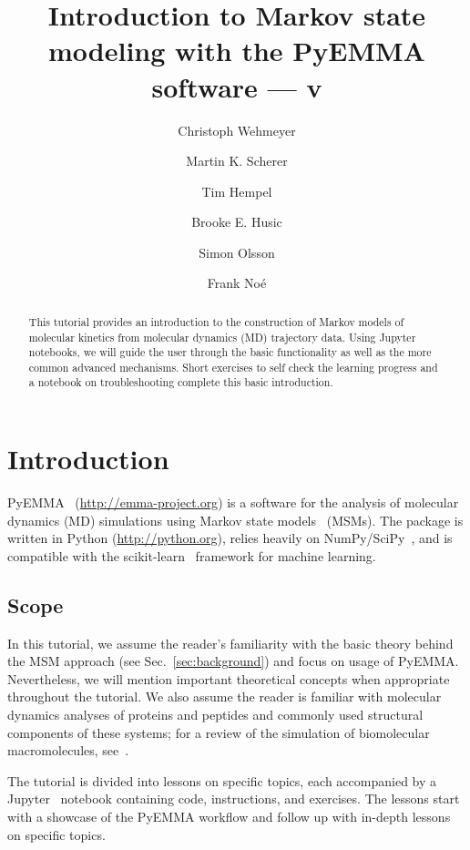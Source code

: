 \documentclass[9pt,tutorial]{livecoms}
\title{Introduction to Markov state modeling with the PyEMMA software --- v\versionnumber}
\author[1\authfn{1}*]{Christoph Wehmeyer}
\author[1\authfn{1}]{Martin K. Scherer}
\author[1\authfn{1}]{Tim Hempel}
\author[2]{Brooke E. Husic}
\author[1]{Simon Olsson}
\author[1*]{Frank Noé}
\affil[1]{Department of Mathematics and Computer Science, Freie Universität Berlin, Arnimallee 6, 14195 Berlin, Germany}
\affil[2]{Department of Chemistry, Stanford University, Stanford, California 94305, USA}
\begin{document}
\begin{frontmatter}
\maketitle

\begin{abstract}
This tutorial provides an introduction to the construction of Markov models of molecular kinetics from molecular dynamics (MD) trajectory data.
Using Jupyter notebooks, we will guide the user through the basic functionality as well as the more common advanced mechanisms.
Short exercises to self check the learning progress and a notebook on troubleshooting complete this basic introduction.
\end{abstract}

\end{frontmatter}

\section{Introduction}

PyEMMA~\cite{pyemma} (\url{http://emma-project.org}) is a software for the analysis of molecular dynamics (MD) simulations using Markov state models~\cite{schuette-msm,singhal-msm-naming} (MSMs).
The package is written in Python (\url{http://python.org}), relies heavily on NumPy/SciPy~\cite{numpy,scipy}, and is compatible with the scikit-learn~\cite{sklearn} framework for machine learning.

\subsection{Scope}

In this tutorial, we assume the reader's familiarity with the basic theory behind the MSM approach (see Sec.~\ref{sec:background}) and focus on usage of PyEMMA.
Nevertheless, we will mention important theoretical concepts when appropriate throughout the tutorial.
We also assume the reader is familiar with molecular dynamics analyses of proteins and peptides and commonly used structural components of these systems; for a review of the simulation of biomolecular macromolecules, see~\cite{dror2012biomolecular}.

The tutorial is divided into lessons on specific topics, each accompanied by a Jupyter~\cite{jupyter} notebook containing code, instructions, and exercises.
The lessons start with a showcase of the PyEMMA workflow and follow up with in-depth lessons on specific topics.
\end{document}
